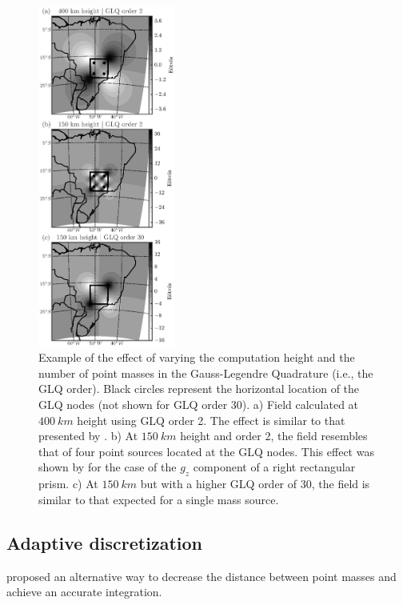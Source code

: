 \documentclass[paper,twocolumn]{geophysics}
\begin{document}
\begin{figure}
    \centering
    \includegraphics[width=0.4\textwidth]{figs/vary-height-and-order}
    \caption{
        Example of the effect of varying
        the computation height
        and the number of point masses in the Gauss-Legendre Quadrature
        (i.e., the GLQ order).
        Black circles represent the horizontal location of the GLQ nodes
        (not shown for GLQ order 30).
        a) Field calculated at $400\ km$ height using GLQ order 2.
        The effect is similar to that presented by \citet{Asgharzadeh2007}.
        b) At $150\ km$ height and order 2,
        the field resembles that of
        four point sources located at the GLQ nodes.
        This effect was shown by \citet{Ku1977}
        for the case of the $g_z$ component of a right rectangular prism.
        c) At $150\ km$ but with a higher GLQ order of 30,
        the field is similar to that expected for a single mass source.
    }
    \label{fig:glqerrorsample}
\end{figure}


\subsection{Adaptive discretization}


\citet{Li2011} proposed an alternative way to decrease the distance between
point masses and achieve an accurate integration.
\end{document}
